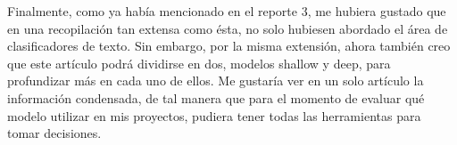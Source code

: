 \documentclass[letterpaper,12pt]{article}
\begin{document}
Finalmente, como ya había mencionado en el reporte 3, me hubiera gustado que en una recopilación
tan extensa como \'esta, no solo hubiesen abordado el \'area de clasificadores de texto. Sin embargo,
por la misma extensi\'on, ahora tambi\'en creo que este art\'iculo podr\'a dividirse 
en dos, modelos shallow y deep, para profundizar m\'as en cada uno de ellos. Me gustaría
ver en un solo art\'iculo la informaci\'on condensada, de tal manera que para el momento de evaluar qu\'e modelo utilizar
en mis proyectos, pudiera tener todas las herramientas para tomar decisiones.





\end{document}
